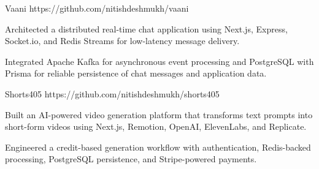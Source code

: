 \project
{Vaani}
{}
{https://github.com/nitishdeshmukh/vaani}
{}
{
\item Architected a distributed real-time chat application using Next.js, Express, Socket.io, and Redis Streams for low-latency message delivery.
\item Integrated Apache Kafka for asynchronous event processing and PostgreSQL with Prisma for reliable persistence of chat messages and application data.
}

\project
{Shorts405}
{}
{https://github.com/nitishdeshmukh/shorts405}
{}
{
\item Built an AI-powered video generation platform that transforms text prompts into short-form videos using Next.js, Remotion, OpenAI, ElevenLabs, and Replicate.
\item Engineered a credit-based generation workflow with authentication, Redis-backed processing, PostgreSQL persistence, and Stripe-powered payments.
}